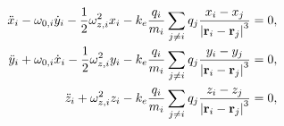 \begin{align}
    \ddot{x}_i - \omega_{0,i} \dot{y}_i - \frac{1}{2}\omega_{z,i}^2 x_i - k_e \frac{q_i}{m_i} \sum_{j\neq i} q_j \frac{x_i - x_j}{\abs{\mathbf{r}_i - \mathbf{r}_j}^3} =0, \label{eq:p4_diffeq_many_particles_x} \\
    \ddot{y}_i + \omega_{0,i} \dot{x}_i - \frac{1}{2}\omega_{z,i}^2 y_i - k_e \frac{q_i}{m_i} \sum_{j\neq i} q_j \frac{y_i - y_j}{\abs{\mathbf{r}_i - \mathbf{r}_j}^3} =0, \label{eq:p4_diffeq_many_particles_y} \\ 
    \ddot{z}_i + \omega_{z,i}^2 z_i - k_e \frac{q_i}{m_i} \sum_{j\neq i} q_j \frac{z_i - z_j}{\abs{\mathbf{r}_i - \mathbf{r}_j}^3} =0, \label{eq:p4_diffeq_many_particles_z}
\end{align}



